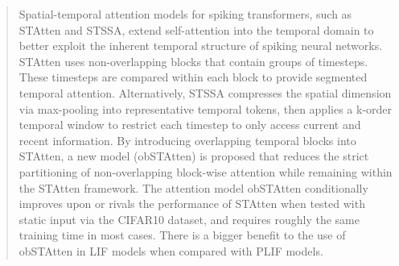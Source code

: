 \begin{abstract}
Spatial-temporal attention models for spiking transformers, such as STAtten and STSSA, extend self-attention into the temporal domain to better exploit the inherent temporal structure of spiking neural networks. STAtten uses non-overlapping blocks that contain groups of timesteps. These timesteps are compared within each block to provide segmented temporal attention. Alternatively, STSSA compresses the spatial dimension via max-pooling into representative temporal tokens, then applies a k-order temporal window to restrict each timestep to only access current and recent information. By introducing overlapping temporal blocks into STAtten, a new model (obSTAtten) is proposed that reduces the strict partitioning of non-overlapping block-wise attention while remaining within the STAtten framework. The attention model obSTAtten conditionally improves upon or rivals the performance of STAtten when tested with static input via the CIFAR10 dataset, and requires roughly the same training time in most cases. There is a bigger benefit to the use of obSTAtten in LIF models when compared with PLIF models.
\end{abstract}